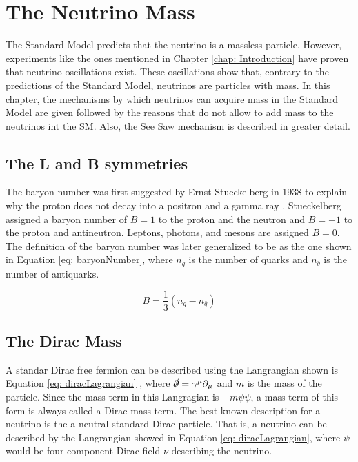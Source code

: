 \chapter{The Neutrino Mass}

The Standard Model predicts that the neutrino is a massless particle. However, experiments like the ones mentioned in Chapter \ref{chap: Introduction} have proven that neutrino oscillations exist. These oscillations show that, contrary to the predictions of the Standard Model, neutrinos are particles with mass. In this chapter, the mechanisms by which neutrinos can acquire mass in the Standard Model are given followed by the reasons that do not allow to add mass to the neutrinos int the SM. Also, the See Saw mechanism is described in greater detail. 

\section{The L and B symmetries} 

The baryon number was first suggested by Ernst Stueckelberg in 1938 to explain why the proton does not decay into a positron and a gamma ray \cite{b-l symmetry}. Stueckelberg assigned a baryon number of $B = 1$ to the proton and the neutron and $B = -1$ to the proton and antineutron. Leptons, photons, and mesons are assigned $B = 0$. The definition of the baryon number was later generalized to be as the one shown in Equation \ref{eq: baryonNumber}, where $n_{q}$ is the number of quarks and $n_{\bar{q}}$ is the number of antiquarks.

\begin{equation}\label{eq: baryonNumber}
B = \frac{1}{3}\left(n_{q} - n_{\bar{q}}\right)
\end{equation}


\section{The Dirac Mass}

A standar Dirac free fermion can be described using the Langrangian shown is Equation \ref{eq: diracLagrangian} \cite{NeutrinoMass}, where $\slashed{\partial} = \gamma^{\mu}\partial_{\mu}$ and $m$ is the mass of the particle. Since the mass term in this Langragian is $-m\bar{\psi}\psi$, a mass term of this form is always called a Dirac mass term. The best known description for a neutrino is the a neutral standard Dirac particle. That is, a neutrino can be described by the Langrangian showed in Equation \ref{eq: diracLagrangian}, where $\psi$ would be four component Dirac field $\nu$ describing the neutrino. 

